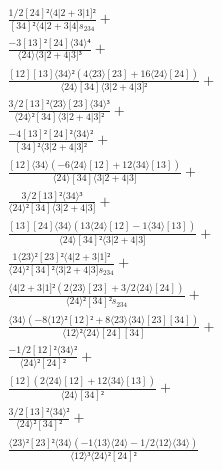 \documentclass[varwidth, border=5pt]{standalone}
\begin{document}
\begin{my}
$\begin{gathered}
\scriptscriptstyle\frac{1/2[24]²⟨4|2+3|1]²}{[34]²⟨4|2+3|4]s_{234}} +\\
\scriptscriptstyle\frac{-3[13]²[24]⟨34⟩⁴}{⟨24⟩⟨3|2+4|3]³} +\\
\scriptscriptstyle\frac{[12][13]⟨34⟩²(4⟨23⟩[23]+16⟨24⟩[24])}{⟨24⟩[34]⟨3|2+4|3]²} +\\
\scriptscriptstyle\frac{3/2[13]²⟨23⟩[23]⟨34⟩³}{⟨24⟩²[34]⟨3|2+4|3]²} +\\
\scriptscriptstyle\frac{-4[13]²[24]²⟨34⟩²}{[34]²⟨3|2+4|3]²} +\\
\scriptscriptstyle\frac{[12]⟨34⟩(-6⟨24⟩[12]+12⟨34⟩[13])}{⟨24⟩[34]⟨3|2+4|3]} +\\
\scriptscriptstyle\frac{3/2[13]²⟨34⟩³}{⟨24⟩²[34]⟨3|2+4|3]} +\\
\scriptscriptstyle\frac{[13][24]⟨34⟩(13⟨24⟩[12]-1⟨34⟩[13])}{⟨24⟩[34]²⟨3|2+4|3]} +\\
\scriptscriptstyle\frac{1⟨23⟩²[23]²⟨4|2+3|1]²}{⟨24⟩²[34]²⟨3|2+4|3]s_{234}} +\\
\scriptscriptstyle\frac{⟨4|2+3|1]²(2⟨23⟩[23]+3/2⟨24⟩[24])}{⟨24⟩²[34]²s_{234}} +\\
\scriptscriptstyle\frac{⟨34⟩(-8⟨12⟩²[12]²+8⟨23⟩⟨34⟩[23][34])}{⟨12⟩²⟨24⟩[24][34]} +\\
\scriptscriptstyle\frac{-1/2[12]²⟨34⟩²}{⟨24⟩²[24]²} +\\
\scriptscriptstyle\frac{[12](2⟨24⟩[12]+12⟨34⟩[13])}{⟨24⟩[34]²} +\\
\scriptscriptstyle\frac{3/2[13]²⟨34⟩²}{⟨24⟩²[34]²} +\\
\scriptscriptstyle\frac{⟨23⟩²[23]²⟨34⟩(-1⟨13⟩⟨24⟩-1/2⟨12⟩⟨34⟩)}{⟨12⟩³⟨24⟩²[24]²} \phantom{+}
\end{gathered}$
\end{my}
\end{document}

